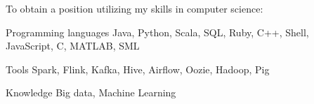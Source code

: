 

\begin{cvparagraph}

To obtain a position utilizing my skills in computer science:

\begin{cvskills}

  \cvskill
    {Programming languages} %
    {Java, Python, Scala, SQL, Ruby, C++, Shell, JavaScript, C, MATLAB, SML} %

  \cvskill
    {Tools} %
    {Spark, Flink, Kafka, Hive, Airflow, Oozie, Hadoop, Pig} %

  \cvskill
    {Knowledge} %
    {Big data, Machine Learning} %

\end{cvskills}


\end{cvparagraph}
